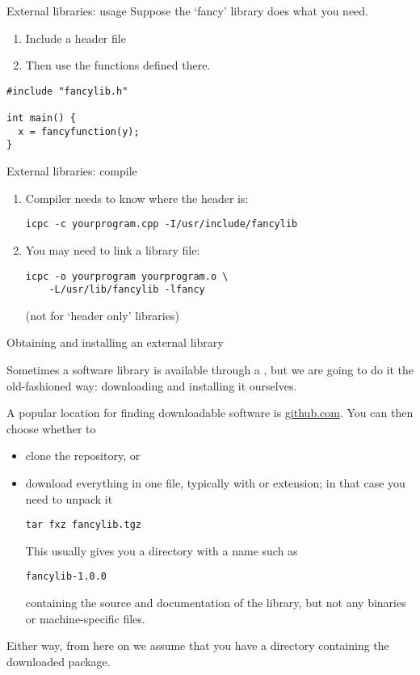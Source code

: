 \begin{slide}{External libraries: usage}
  \label{sl:lib-use}
  Suppose the `fancy' library does what you need.
  \begin{enumerate}
  \item
    Include a header file
  \item Then use the functions defined there.
  \end{enumerate}

\begin{lstlisting}
#include "fancylib.h"

int main() {
  x = fancyfunction(y);
}
\end{lstlisting}
\end{slide}

\begin{slide}{External libraries: compile}
  \label{sl:lib-compile}
  \begin{enumerate}
  \item Compiler needs to know where the header is:
\begin{verbatim}
icpc -c yourprogram.cpp -I/usr/include/fancylib
\end{verbatim}
\item You may need to link a library file:
\begin{verbatim}
icpc -o yourprogram yourprogram.o \
    -L/usr/lib/fancylib -lfancy
\end{verbatim}
(not for `header only' libraries)
  \end{enumerate}
\end{slide}

 {Obtaining and installing an external library}

Sometimes a software library is available through a ,
but we are going to do it the old-fashioned way:
downloading and installing it ourselves.

A popular location for finding downloadable software is \url{github.com}.
You can then choose whether to
\begin{itemize}
\item clone the repository, or
\item download everything in one file, typically with  or  extension;
  in that case you need to unpack it
\begin{verbatim}
tar fxz fancylib.tgz
\end{verbatim}
This usually gives you a directory with a name such as
\begin{verbatim}
fancylib-1.0.0
\end{verbatim}
containing the source and documentation of the library,
but not any binaries or machine-specific files.
\end{itemize}
Either way, from here on we assume that you have a directory containing the downloaded package.

